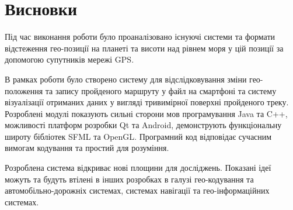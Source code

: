 \documentclass[simple,a4paper,14pt,ukrainian,utf8]{eskdtext}
\begin{document}
  \clearpage \newpage
  
  \section*{Висновки}

    Під час виконання роботи було проаналізовано існуючі системи та формати відстеження гео-позиції на планеті та висоти над рівнем моря у цій позиції за допомогою супутників мережі GPS.

    В рамках роботи було створено систему для відслідковування зміни гео-положення та запису пройденого маршруту у файл на смартфоні та систему візуалізації отриманих даних у вигляді тривимірної поверхні пройденого треку. Розроблені модулі показують сильні сторони мов програмування Java та C++, можливості платформ розробки Qt та Android, демонструють функціональну широту бібліотек SFML та OpenGL. Програмний код відповідає сучасним вимогам кодування та простий для розуміння.

    Розроблена система відкриває нові площини для досліджень. Показані ідеї можуть та будуть втілені в інших розробках в галузі гео-кодування та автомобільно-дорожніх системах, системах навігації та гео-інформаційних системах.

\newpage


\renewcommand\bibname{Використана література}

\end{document}
